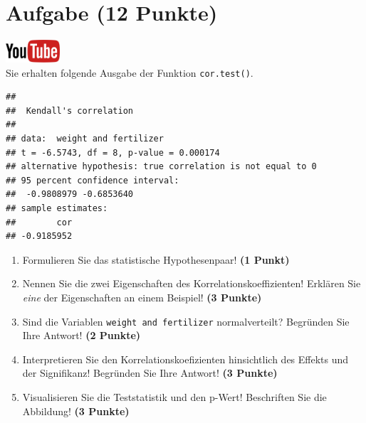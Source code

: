 \documentclass[a4paper, 10pt]{scrartcl}\usepackage[]{graphicx}\usepackage[]{xcolor}
\makeatletter
\newenvironment{kframe}{%
 \def\at@end@of@kframe{}%
 \ifinner\ifhmode%
  \def\at@end@of@kframe{\end{minipage}}%
  \begin{minipage}{\columnwidth}%
 \fi\fi%
 \def\FrameCommand##1{\hskip\@totalleftmargin \hskip-\fboxsep
 \colorbox{shadecolor}{##1}\hskip-\fboxsep
     \hskip-\linewidth \hskip-\@totalleftmargin \hskip\columnwidth}%
 \MakeFramed {\advance\hsize-\width
   \@totalleftmargin\z@ \linewidth\hsize
   \@setminipage}}%
 {\par\unskip\endMakeFramed%
 \at@end@of@kframe}
\newenvironment{knitrout}{}{} %
\makeatother
\begin{document}
 
\clearpage

\section{Aufgabe \hfill (12 Punkte)}

\hfill\href{https://youtu.be/C9skfFRTHhI}{\includegraphics[width =
   2cm]{img/youtube}}\\[1Ex]

Sie erhalten folgende \Rlogo Ausgabe der Funktion \texttt{cor.test()}.

\begin{knitrout}
\color{fgcolor}\begin{kframe}
\begin{verbatim}
## 
## 	Kendall's correlation
## 
## data:  weight and fertilizer
## t = -6.5743, df = 8, p-value = 0.000174
## alternative hypothesis: true correlation is not equal to 0
## 95 percent confidence interval:
##  -0.9808979 -0.6853640
## sample estimates:
##        cor 
## -0.9185952
\end{verbatim}
\end{kframe}
\end{knitrout}


\begin{enumerate}
  \item Formulieren Sie das statistische Hypothesenpaar! \textbf{(1
Punkt)}
\item Nennen Sie die zwei Eigenschaften des Korrelationskoeffizienten!
  Erkl{\"a}ren Sie \textit{eine} der Eigenschaften an einem Beispiel! \textbf{(3
    Punkte)}
\item Sind die Variablen \texttt{weight and fertilizer} normalverteilt?
  Begr{\"u}nden Sie Ihre Antwort! \textbf{(2 Punkte)}
\item Interpretieren Sie den Korrelationskoefizienten hinsichtlich des
  Effekts und der Signifikanz! Begr{\"u}nden Sie
  Ihre Antwort! \textbf{(3 Punkte)}
\item Visualisieren Sie die Teststatistik und den p-Wert! Beschriften Sie die Abbildung! \textbf{(3 Punkte)} 
\end{enumerate} 
\clearpage
\end{document}

